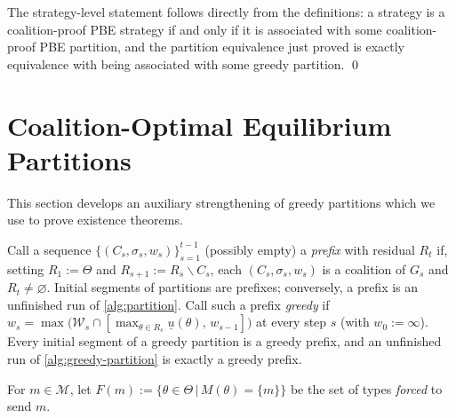 \documentclass[11pt]{article}
\newcommand{\sep}{\,|\,}
\newcommand{\Msg}{\mathcal{M}}
\newcommand{\W}{\mathcal{W}}
\begin{document}
The strategy-level statement follows directly from the definitions: a strategy is a coalition-proof PBE strategy if and only if it is associated with some coalition-proof PBE partition, and the partition equivalence just proved is exactly equivalence with being associated with some greedy partition. \qed

\section{Coalition-Optimal Equilibrium Partitions}\label{sec:coe}

This section develops an auxiliary strengthening of greedy partitions which we use to prove existence theorems.

Call a sequence $\{(C_s,\sigma_s,w_s)\}_{s=1}^{t-1}$ (possibly empty) a \emph{prefix} with residual $R_t$ if, setting $R_1:=\Theta$ and $R_{s+1}:=R_s\smallsetminus C_s$, each $(C_s,\sigma_s,w_s)$ is a coalition of $G_s$ and $R_t\neq\varnothing$. Initial segments of partitions are prefixes; conversely, a prefix is an unfinished run of \cref{alg:partition}. Call such a prefix \emph{greedy} if $w_s=\max\bigl(\W_s\cap[\max_{\theta\in R_s}\underline{u}(\theta),\,w_{s-1}]\bigr)$ at every step $s$ (with $w_0:=\infty$). Every initial segment of a greedy partition is a greedy prefix, and an unfinished run of \cref{alg:greedy-partition} is exactly a greedy prefix.

For $m\in\Msg$, let $F(m):=\{\theta\in\Theta\sep M(\theta)=\{m\}\}$ be the set of types \emph{forced} to send $m$.
\end{document}
